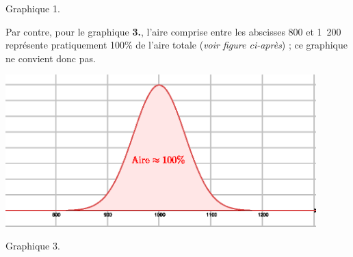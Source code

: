 \begin{corrige}
\begin{enumerate}
          \begin{center}
               Graphique 1.
          \end{center}
          \par
          Par contre, pour le graphique \textbf{3.}, l'aire comprise entre les abscisses 800 et 1\ 200 représente pratiquement 100\% de l'aire totale (\textit{voir figure ci-après}) ; ce graphique ne convient donc pas.
          \begin{center}
               \begin{extern}%
                    \includegraphics[width=0.9\textwidth]{images/BBESL-s5-1-6}%
               \end{extern}
          \end{center}
\begin{center}
\end{center}
          \begin{center}
               Graphique 3.
          \end{center}
\end{enumerate}
\end{corrige}

